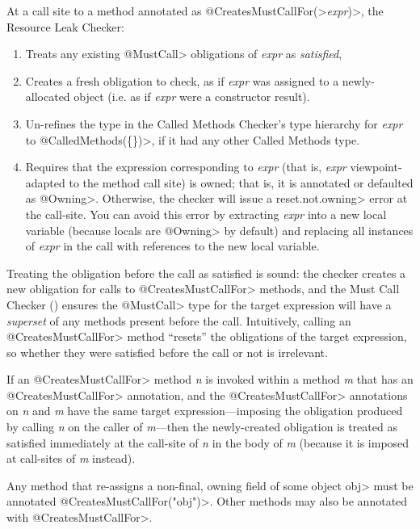 At a call site to a method annotated as
\<@CreatesMustCallFor(>\emph{expr}\<)>, the Resource Leak Checker:
\begin{enumerate}
\item
  Treats any existing \<@MustCall> obligations of \emph{expr} as \emph{satisfied},
\item
  Creates a fresh obligation to check, as if \emph{expr} was assigned to a newly-allocated
  object (i.e. as if \emph{expr} were a constructor result).
\item
  Un-refines the type in the Called Methods Checker's type hierarchy for \emph{expr} to
  \<@CalledMethods(\{\})>, if it had any other Called Methods type.
\item
  Requires that the expression corresponding to \emph{expr} (that is, \emph{expr}
  viewpoint-adapted to the method call site) is owned; that is, it is
  annotated or defaulted as \<@Owning>.  Otherwise, the checker
  will issue a \<reset.not.owning> error at the call-site. You can avoid this
  error by extracting \emph{expr} into a new local variable (because
  locals are \<@Owning> by default) and replacing all instances of \emph{expr}
  in the call with references to the new local variable.
\end{enumerate}

Treating the obligation before the call as satisfied is sound: the
checker creates a new obligation for calls to \<@CreatesMustCallFor> methods,
and the Must Call Checker () ensures the
\<@MustCall> type for the target expression will have a \emph{superset} of any methods
present before the call. Intuitively, calling an \<@CreatesMustCallFor> method
``resets'' the obligations of the target expression, so whether they were satisfied before
the call or not is irrelevant.

If an \<@CreatesMustCallFor>
method \emph{n} is invoked within a method \emph{m} that has an \<@CreatesMustCallFor> annotation,
and the \<@CreatesMustCallFor> annotations on \emph{n} and \emph{m} have
the same target expression---imposing the obligation produced by calling \emph{n} on the caller of \emph{m}---then
the newly-created obligation is treated as satisfied immediately
at the call-site of \emph{n} in the body of \emph{m} (because it is imposed at call-sites of \emph{m}
instead).



Any method that re-assigns a non-final, owning field of some object \<obj>
must be annotated \<@CreatesMustCallFor("obj")>.
Other methods may also be annotated with \<@CreatesMustCallFor>.

